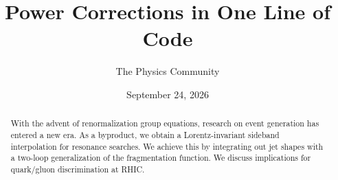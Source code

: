\documentclass[11pt]{article}
\title{Power Corrections in One Line of Code}
\author{The Physics Community}
\date{September 24, 2026}
\numberwithin{equation}{section}
\theoremstyle{definition}
\theoremstyle{remark}
\begin{document}
\maketitle
\begin{abstract}
With the advent of renormalization group equations, research on event
generation has entered a new era. As a byproduct, we obtain a
Lorentz-invariant sideband interpolation for resonance searches. We
achieve this by integrating out jet shapes with a two-loop
generalization of the fragmentation function. We discuss implications
for quark/gluon discrimination at RHIC.
\end{abstract}
\tableofcontents




\nocite{*}


\end{document}
